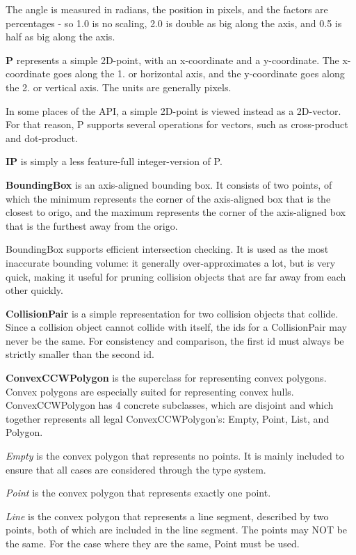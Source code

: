 The angle is measured in radians, the position in pixels,
and the factors are percentages - so 1.0 is no scaling,
2.0 is double as big along the axis, and 0.5
is half as big along the axis.

\textbf{P} represents a simple 2D-point,
with an x-coordinate and a y-coordinate.
The x-coordinate goes along the 1. or horizontal
axis, and the y-coordinate goes along the 2. or
vertical axis. The units are generally pixels.

In some places of the API, a simple 2D-point
is viewed instead as a 2D-vector. For that reason,
P supports several operations for vectors,
such as cross-product and dot-product.

\textbf{IP} is simply a less feature-full
integer-version of P.

\textbf{BoundingBox} is an axis-aligned bounding box.
It consists of two points, of which the minimum
represents the corner of the axis-aligned box
that is the closest to origo, and the maximum
represents the corner of the axis-aligned box
that is the furthest away from the origo.

BoundingBox supports efficient intersection
checking. It is used as the most inaccurate
bounding volume: it generally over-approximates
a lot, but is very quick, making it useful for
pruning collision objects that are far away from
each other quickly.

\textbf{CollisionPair} is a simple representation
for two collision objects that collide. Since a
collision object cannot collide with itself,
the ids for a CollisionPair may never be the same.
For consistency and comparison, the first id
must always be strictly smaller than the second id.

\textbf{ConvexCCWPolygon} is the superclass for representing
convex polygons. Convex polygons are especially suited for
representing convex hulls. ConvexCCWPolygon has 4 concrete
subclasses, which are disjoint and which together represents
all legal ConvexCCWPolygon's: Empty, Point, List, and Polygon.

\textit{Empty} is the convex polygon that represents no points.
It is mainly included to ensure that all cases are considered
through the type system.

\textit{Point} is the convex polygon that represents exactly one point.

\textit{Line} is the convex polygon that represents a line segment,
described by two points, both of which are included in the line segment.
The points may NOT be the same. For the case where they are the same,
Point must be used.

